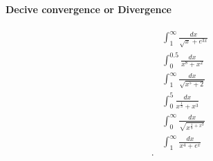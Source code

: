 \documentclass[a4paper]{article}
\begin{document}
\paragraph{Decive convergence or Divergence}%
\label{par:Decive convergence or Divergence}

\begin{align*}
 &\int_{1}^{\infty} \frac{dx}{\sqrt{x}+e^{3x}} \\
 &\int_{0}^{0.5} \frac{dx}{x^{8}+x^2} \\
 &\int_{1}^{\infty} \frac{dx}{\sqrt{x^{5}+2}} \\
 &\int_{0}^{5} \frac{dx}{x^{\frac{1}{3}}+x^3} \\
 &\int_{0}^{\infty} \frac{dx}{\sqrt{x^{\frac{1}{3}+x^3}}} \\
 &\int_{1}^{\infty} \frac{dx}{x^{4}+e^{x}}\\
.\end{align*}
\end{document}

